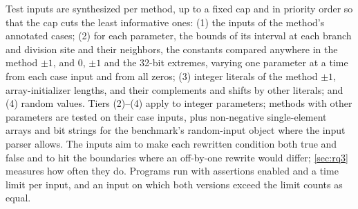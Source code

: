 Test inputs are synthesized per method, up to a fixed cap and in priority order
so that the cap cuts the least informative ones: (1) the inputs of the
method's annotated cases; (2) for each parameter, the bounds of its interval at
each branch and division site and their neighbors, the constants compared
anywhere in the method $\pm1$, and $0$, $\pm1$ and the 32-bit extremes, varying
one parameter at a time from each case input and from all zeros; (3) integer
literals of the method $\pm1$, array-initializer lengths, and their
complements and shifts by other literals; and (4) random values. Tiers (2)--(4)
apply to integer parameters; methods with other parameters are tested on their
case inputs, plus non-negative single-element arrays and bit strings for the
benchmark's random-input object where the input parser allows. The inputs aim
to make each rewritten condition both true and false and to hit the boundaries
where an off-by-one rewrite would differ; \cref{sec:rq3} measures how often
they do. Programs run with assertions enabled and a time limit per input, and an
input on which both versions exceed the limit counts as equal.
